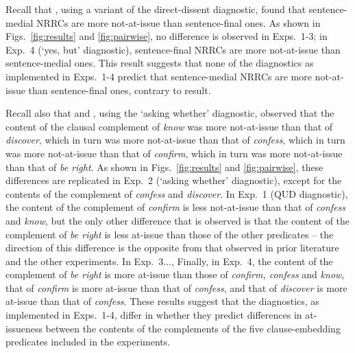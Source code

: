 \documentclass[times,linguex,xcolor]{glossa}
\begin{document}
  Recall that \citealt{syrett_experimental_2015}, using a variant of the direct-dissent diagnostic, found that sentence-medial NRRCs are more not-at-issue than sentence-final ones. As shown in Figs.~\ref{fig:results} and \ref{fig:pairwise}, no difference is observed in Exps.~1-3; in Exp.~4 (`yes, but' diagnostic), sentence-final NRRCs are more not-at-issue than sentence-medial ones.  This result suggests that none of the diagnostics as implemented in Exps.~1-4 predict that sentence-medial NRRCs are more not-at-issue than sentence-final ones, contrary to  result.
  
  Recall also that \citealt{tonhauser_how_2018} and \citealt{degen-tonhauser-glossa}, using the `asking whether' diagnostic, observed that the content of the clausal complement of \emph{know} was more not-at-issue than that of \emph{discover}, which in turn was more not-at-issue than that of \emph{confess}, which in turn was more not-at-issue than that of \emph{confirm}, which in turn was more not-at-issue than that of \emph{be right}.  As shown in Figs.~\ref{fig:results} and \ref{fig:pairwise}, these differences are replicated in Exp.~2 (`asking whether' diagnostic), except for the contents of the complement of \emph{confess} and \emph{discover}. In Exp.~1 (QUD diagnostic), the content of the complement of \emph{confirm} is less not-at-issue than that of \emph{confess} and \emph{know}, but the only other difference that is observed is that the content of the complement of \emph{be right} is less at-issue than those of the other predicates -- the direction of this difference is the opposite from that observed in prior literature and the other experiments. In Exp.~3..., Finally, in Exp.~4, the content of the complement of \emph{be right} is more at-issue than those of \emph{confirm, confess} and \emph{know}, that of \emph{confirm} is more at-issue than that of \emph{confess}, and that of \emph{discover} is more at-issue than that of \emph{confess}. These results suggest that the diagnostics, as implemented in Exps.~1-4, differ in whether they predict differences in at-issueness between the contents of the complements of the five clause-embedding predicates included in the experiments.
   


\end{document}

